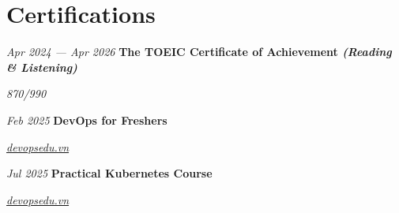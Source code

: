 \section{Certifications}

\begin{twocolentry}{
		\textit{Apr 2024 --- Apr 2026}
	}
	\textbf{The TOEIC Certificate of Achievement \textit{(Reading \& Listening)}}

	\textit{870/990}
\end{twocolentry}

\vspace{0.2 cm}

\begin{twocolentry}{
		\textit{Feb 2025}
	}
	\textbf{DevOps for Freshers}

	\textit{\href{https://devopsedu.vn/chung-chi-gia-su-2?cert_hash=6dd621137b146655}{devopsedu.vn}}
\end{twocolentry}

\vspace{0.2 cm}

\begin{twocolentry}{
		\textit{Jul 2025}
	}
	\textbf{Practical Kubernetes Course}

	\textit{\href{https://devopsedu.vn/chung-chi-gia-su-2?cert_hash=b6d5c7c0b26c29d5}{devopsedu.vn}}
\end{twocolentry}
